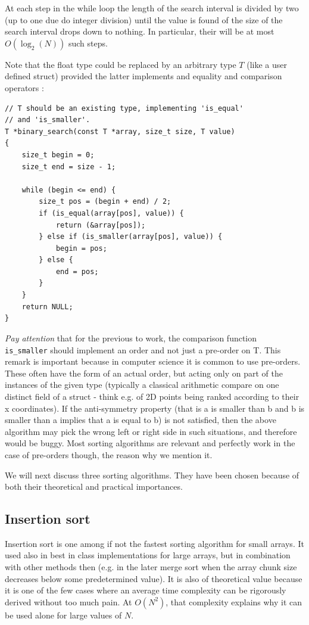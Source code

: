 \documentclass[12pt]{article}
\theoremstyle{plain}
\theoremstyle{remark}
\begin{document}
At each step in the while loop the length of the search interval is divided by
two (up to one due do integer division) until the value is found of the size of
the search interval drops down to nothing. In particular, their will be at most
$O(\log_2(N))$ such steps. 

Note that the float type could be replaced by an arbitrary type $T$ (like a user
defined struct) provided the latter implements and equality and comparison 
operators : 

\begin{lstlisting}[style=C]
// T should be an existing type, implementing 'is_equal' 
// and 'is_smaller'.
T *binary_search(const T *array, size_t size, T value)
{
	size_t begin = 0;
	size_t end = size - 1;

	while (begin <= end) {
		size_t pos = (begin + end) / 2;
		if (is_equal(array[pos], value)) {
			return (&array[pos]);
		} else if (is_smaller(array[pos], value)) {
			begin = pos;
		} else {
			end = pos;
		}
	}
	return NULL;
}
\end{lstlisting}

{\it Pay attention} that for the previous to work, the comparison function {\tt
is\_smaller} should implement an order and not just a pre-order on T. This remark
is important because in computer science it is common to use pre-orders. These
often have the form of an actual order, but acting only on part of the instances
of the given type
(typically a classical arithmetic compare on one distinct field of a struct -
think  e.g. of 2D points being ranked according to their x coordinates).
If the anti-symmetry property (that is a is smaller than b and b is smaller than
a implies that a is equal to b) is not satisfied, then the above algorithm may 
pick the wrong left or right side in such situations, and therefore would be
buggy. Most sorting algorithms are relevant and perfectly work in the case of 
pre-orders though, the reason why we mention it.


We will next discuss three sorting algorithms. They have been chosen because of
both their theoretical and practical importances.

\subsection{Insertion sort}

Insertion sort is one among if not the fastest sorting algorithm for small
arrays. It used also in best in class implementations for large arrays, but
in combination with other methods then (e.g. in the later merge sort when 
the array chunk size decreases below some predetermined value).  It is also
of theoretical value because it is one of the few cases where an average
time complexity can be rigorously derived without too much pain. At $O(N^2)$,
that complexity explains why it can be used alone for large values of $N.$
\end{document}

